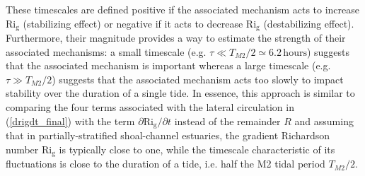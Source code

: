 These timescales are defined positive if the associated mechanism acts to increase $\mathrm{Ri_g}$ (stabilizing effect) or negative if it acts to decrease $\mathrm{Ri_g}$ (destabilizing effect). Furthermore, their magnitude provides a way to estimate the strength of their associated mechanisms: a small timescale (e.g. $\tau \ll T_{M2} / 2 \simeq 6.2 \, \mathrm{hours}$) suggests that the associated mechanism is important whereas a large timescale (e.g. $\tau \gg T_{M2} / 2$) suggests that the associated mechanism acts too slowly to impact stability over the duration of a single tide. In essence, this approach is similar to comparing the four terms associated with the lateral circulation in (\ref{drigdt_final}) with the term $\partial \mathrm{Ri_g} / \partial t$ instead of the remainder $R$ and assuming that in partially-stratified shoal-channel estuaries, the gradient Richardson number $\mathrm{Ri_g}$ is typically close to one, while the timescale characteristic of its fluctuations is close to the duration of a tide, i.e. half the M2 tidal period $T_{M2} / 2$.

